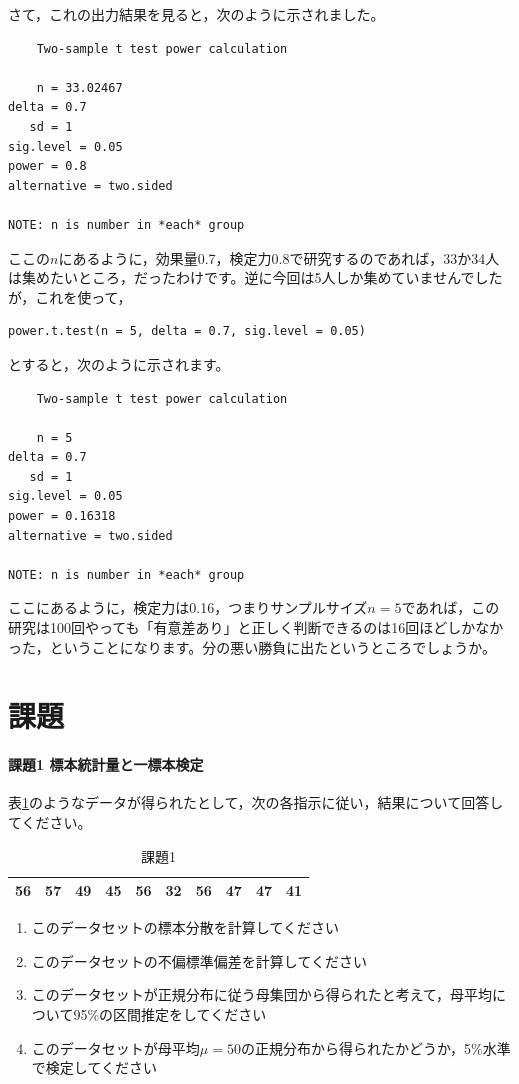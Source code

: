 \documentclass{ltjsbook}
\begin{document}
さて，これの出力結果を見ると，次のように示されました。
\begin{tcolorbox}
\begin{verbatim}
    Two-sample t test power calculation 

    n = 33.02467
delta = 0.7
   sd = 1
sig.level = 0.05
power = 0.8
alternative = two.sided

NOTE: n is number in *each* group\end{verbatim}
\end{tcolorbox}
ここの$n$にあるように，効果量0.7，検定力0.8で研究するのであれば，33か34人は集めたいところ，だったわけです。逆に今回は5人しか集めていませんでしたが，これを使って，
\begin{lstlisting}
power.t.test(n = 5, delta = 0.7, sig.level = 0.05)
\end{lstlisting}
とすると，次のように示されます。
\begin{tcolorbox}
\begin{verbatim}
    Two-sample t test power calculation 

    n = 5
delta = 0.7
   sd = 1
sig.level = 0.05
power = 0.16318
alternative = two.sided

NOTE: n is number in *each* group\end{verbatim}
\end{tcolorbox}
ここにあるように，検定力は0.16，つまりサンプルサイズ$n=5$であれば，この研究は100回やっても「有意差あり」と正しく判断できるのは16回ほどしかなかった，ということになります。分の悪い勝負に出たというところでしょうか。
\section{課題}
\paragraph{課題1 標本統計量と一標本検定}
表\ref{exe:20_1}のようなデータが得られたとして，次の各指示に従い，結果について回答してください。
\begin{table}[ht]
    \centering
    \caption{課題1}
    \label{exe:20_1}
    \begin{tabular}{rrrrrrrrrr}
      \hline
    56 & 57 & 49 & 45 & 56 & 32 & 56 & 47 & 47 & 41 \\ 
       \hline
    \end{tabular}
    \end{table}
\begin{enumerate}
    \item このデータセットの標本分散を計算してください
    \item このデータセットの不偏標準偏差を計算してください
    \item このデータセットが正規分布に従う母集団から得られたと考えて，母平均について95\%の区間推定をしてください
    \item このデータセットが母平均$\mu=50$の正規分布から得られたかどうか，5\%水準で検定してください
\end{enumerate}
\end{document}

